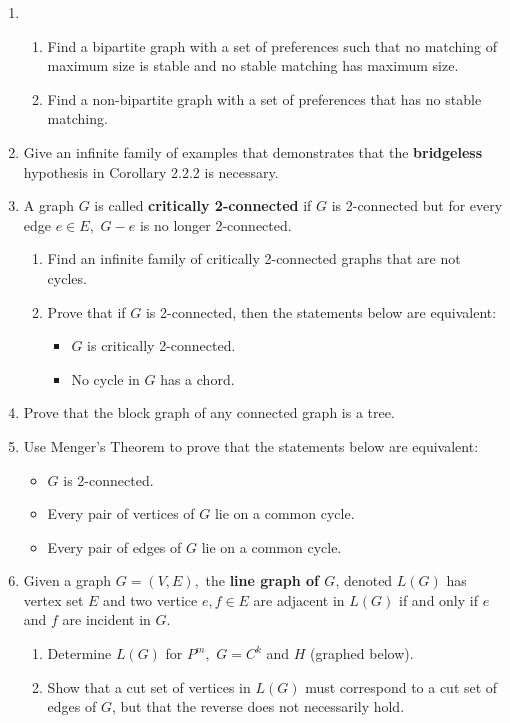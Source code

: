 \documentclass[12pt]{article}
\renewcommand{\emph}[1]{\textsf{\textbf{#1}}}
\begin{document}
\begin{enumerate}
\item 
\begin{enumerate}
	\item Find a bipartite graph with a set of preferences such that no matching of maximum size is stable and no stable matching has maximum size. 
	\item Find a non-bipartite graph with a set of preferences that has no stable matching.
\end{enumerate}
\item Give an infinite family of examples that demonstrates that the \emph{bridgeless} hypothesis in Corollary 2.2.2 is necessary.
\item A graph $G$ is called \emph{critically 2-connected} if $G$ is 2-connected but for every edge $e \in E,$ $G-e$ is no longer 2-connected.
	\begin{enumerate}
	\item Find an infinite family of critically 2-connected graphs that are not cycles.
	\item Prove that if $G$ is 2-connected, then the statements below are equivalent:
		\begin{itemize}
		\item $G$ is critically 2-connected.
		\item No cycle in $G$ has a chord.
		\end{itemize}
	\end{enumerate}
\item Prove that the block graph of any connected graph is a tree.
\item Use Menger's Theorem to prove that the statements below are equivalent:
	\begin{itemize}
	\item $G$ is 2-connected.
	\item Every pair of vertices of $G$ lie on a common cycle.
	\item Every pair of edges of $G$ lie on a common cycle. 
	\end{itemize}
\item Given a graph $G=(V,E),$ the \emph{line graph of $G$}, denoted $L(G)$ has vertex set $E$ and two vertice $e,f \in E$ are adjacent in $L(G)$ if and only if $e$ and $f$ are incident in $G$.
	\begin{enumerate}
	\item Determine $L(G)$ for $P^m,$ $G=C^k$ and $H$ (graphed below).\\
	
\item Show that a cut set of vertices in $L(G)$ must correspond to a cut set of edges of $G$, but that the reverse does not necessarily hold.
\end{enumerate}
	
\end{enumerate}
\end{document}
